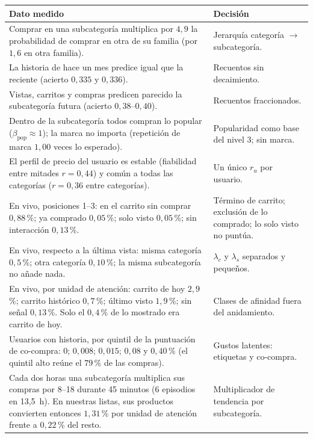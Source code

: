 \documentclass[11pt,a4paper]{article}
\begin{document}
\begin{center}
\begin{tabular}{p{7.4cm}p{7.4cm}}
\toprule
Dato medido & Decisión\\
\midrule
Comprar en una subcategoría multiplica por $4{,}9$ la probabilidad de comprar en otra de su familia
(por $1{,}6$ en otra familia). & Jerarquía categoría $\to$ subcategoría.\\
La historia de hace un mes predice igual que la reciente (acierto $0{,}335$ y $0{,}336$). & Recuentos sin
decaimiento.\\
Vistas, carritos y compras predicen parecido la subcategoría futura (acierto $0{,}38$--$0{,}40$). & Recuentos
fraccionados.\\
Dentro de la subcategoría todos compran lo popular ($\beta_{\text{pop}}\approx 1$); la marca no importa
(repetición de marca $1{,}00$ veces lo esperado). & Popularidad como base del nivel 3; sin marca.\\
El perfil de precio del usuario es estable (fiabilidad entre mitades $r=0{,}44$) y común a todas las
categorías ($r=0{,}36$ entre categorías). & Un único $r_u$ por usuario.\\
En vivo, posiciones 1--3: en el carrito sin comprar $0{,}88$\,\%; ya comprado $0{,}05$\,\%; solo visto
$0{,}05$\,\%; sin interacción $0{,}13$\,\%. & Término de carrito; exclusión de lo comprado; lo solo visto no
puntúa.\\
En vivo, respecto a la última vista: misma categoría $0{,}5$\,\%; otra categoría $0{,}10$\,\%; la misma
subcategoría no añade nada. & $\lambda_c$ y $\lambda_s$ separados y pequeños.\\
En vivo, por unidad de atención: carrito de hoy $2{,}9$\,\%; carrito histórico $0{,}7$\,\%; último visto
$1{,}9$\,\%; sin señal $0{,}13$\,\%. Solo el $0{,}4$\,\% de lo mostrado era carrito de hoy. & Clases de
afinidad fuera del anidamiento.\\
Usuarios con historia, por quintil de la puntuación de co-compra: $0$; $0{,}008$; $0{,}015$; $0{,}08$ y
$0{,}40$\,\% (el quintil alto reúne el $79$\,\% de las compras). & Gustos latentes: etiquetas y co-compra.\\
Cada dos horas una subcategoría multiplica sus compras por 8--18 durante 45 minutos (6 episodios en 13{,}5~h).
En nuestras listas, sus productos convierten entonces $1{,}31$\,\% por unidad de atención frente a
$0{,}22$\,\% del resto. & Multiplicador de tendencia por subcategoría.\\
\bottomrule
\end{tabular}
\end{center}
\end{document}
